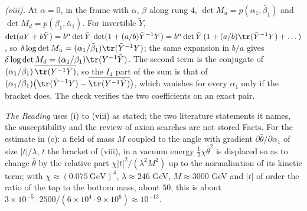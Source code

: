 \emph{(viii).} At $\alpha = 0$, in the frame with $\alpha$, $\beta$ along rung $4$, $\det M_{u} = p(\alpha_{1}, \bar\beta_{1})$ and $\det M_{d} = p(\beta_{1}, \bar\alpha_{1})$. For invertible $\tilde{Y}$, $\det(a Y + b\tilde{Y}) = b^{n}\det\tilde{Y}\,\det(1 + (a/b)\tilde{Y}^{-1}Y) = b^{n}\det\tilde{Y}\,(1 + (a/b)\tr(\tilde{Y}^{-1}Y) + \dots)$, so $\delta\log\det M_{u} = (\alpha_{1}/\bar\beta_{1})\tr(\tilde{Y}^{-1}Y)$; the same expansion in $b/a$ gives $\delta\log\det M_{d} = (\bar\alpha_{1}/\beta_{1})\tr(Y^{-1}\tilde{Y})$. The second term is the conjugate of $(\alpha_{1}/\bar\beta_{1})\,\overline{\tr(Y^{-1}\tilde{Y})}$, so the $I_{4}$ part of the sum is that of $(\alpha_{1}/\bar\beta_{1})\bigl(\tr(\tilde{Y}^{-1}Y) - \overline{\tr(Y^{-1}\tilde{Y})}\bigr)$, which vanishes for every $\alpha_{1}$ only if the bracket does. The check verifies the two coefficients on an exact pair.

\emph{The Reading} uses (i) to (viii) as stated; the two literature statements it names, the susceptibility and the review of axion searches are not stored Facts. For the estimate in (c): a field of mass $M$ coupled to the angle with gradient $\partial\bar\theta/\partial\alpha_{1}$ of size $|t|/\lambda$, $t$ the bracket of (viii), in a vacuum energy $\tfrac12\chi\bar\theta^{2}$ is displaced so as to change $\bar\theta$ by the relative part $\chi|t|^{2}/(\lambda^{2}M^{2})$ up to the normalisation of its kinetic term; with $\chi \approx (0.075\ \mathrm{GeV})^{4}$, $\lambda \approx 246$ GeV, $M \approx 3000$ GeV and $|t|$ of order the ratio of the top to the bottom mass, about $50$, this is about $3 \times 10^{-5} \cdot 2500/(6 \times 10^{4} \cdot 9 \times 10^{6}) \approx 10^{-13}$.
